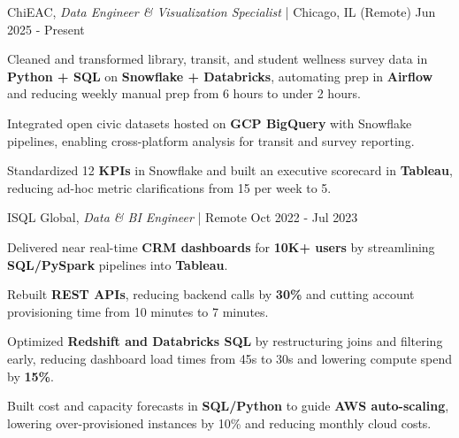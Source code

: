 
\begin{cventries2}


  \cventrynew
    {ChiEAC, \textnormal{\textit{Data Engineer \& Visualization Specialist} | Chicago, IL (Remote)}} %
    {Jun 2025 - Present} %
    {
      \begin{cvitems}
        \item {Cleaned and transformed library, transit, and student wellness survey data in {\bf Python + SQL} on {\bf Snowflake + Databricks}, automating prep in {\bf Airflow} and reducing weekly manual prep from 6 hours to under 2 hours.}
        \item {Integrated open civic datasets hosted on {\bf GCP BigQuery} with Snowflake pipelines, enabling cross-platform analysis for transit and survey reporting.}
        \item {Standardized 12 {\bf KPIs} in Snowflake and built an executive scorecard in {\bf Tableau}, reducing ad-hoc metric clarifications from 15 per week to 5.}
        \end{cvitems}        
    }

  \cventrynew
    {ISQL Global, \textnormal{\textit{Data \& BI Engineer}} | Remote} %
    {Oct 2022 - Jul 2023} %
    {
      \begin{cvitems}
        \item {Delivered near real-time {\bf CRM dashboards} for {\bf 10K+ users} by streamlining {\bf SQL/PySpark} pipelines into {\bf Tableau}.}
        \item {Rebuilt {\bf REST APIs}, reducing backend calls by {\bf 30\%} and cutting account provisioning time from 10 minutes to 7 minutes.}
        \item {Optimized {\bf Redshift and Databricks SQL} by restructuring joins and filtering early, reducing dashboard load times from 45s to 30s and lowering compute spend by {\bf 15\%}.}
        \item {Built cost and capacity forecasts in {\bf SQL/Python} to guide {\bf AWS auto-scaling}, lowering over-provisioned instances by 10\% and reducing monthly cloud costs.}
      \end{cvitems}
    }


\end{cventries2}
